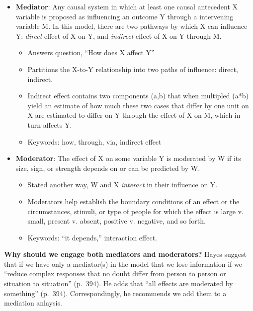 \documentclass[
  11pt,
]{book}
\providecommand{\tightlist}{%
  \setlength{\itemsep}{0pt}\setlength{\parskip}{0pt}}
\begin{document}
\begin{itemize}
\tightlist
\item
  \textbf{Mediator}: Any causal system in which at least one causal antecedent X variable is proposed as influencing an outcome Y through a intervening variable M. In this model, there are two pathways by which X can influence Y: \emph{direct} effect of X on Y, and \emph{indirect} effect of X on Y through M.

  \begin{itemize}
  \tightlist
  \item
    Answers question, ``How does X affect Y''
  \item
    Partitions the X-to-Y relationship into two paths of influence: direct, indirect.
  \item
    Indirect effect contains two components (a,b) that when multipled (a*b) yield an estimate of how much these two cases that differ by one unit on X are estimated to differ on Y through the effect of X on M, which in turn affects Y.
  \item
    Keywords: how, through, via, indirect effect
  \end{itemize}
\item
  \textbf{Moderator}: The effect of X on some variable Y is moderated by W if its size, sign, or strength depends on or can be predicted by W.

  \begin{itemize}
  \tightlist
  \item
    Stated another way, W and X \emph{interact} in their influence on Y.\\
  \item
    Moderators help establish the boundary conditions of an effect or the circumstances, stimuli, or type of people for which the effect is large v. small, present v. absent, positive v. negative, and so forth.
  \item
    Keywords: ``it depends,'' interaction effect.
  \end{itemize}
\end{itemize}

\textbf{Why should we engage both mediators and moderators?} Hayes \citeyearpar{hayes_introduction_2018} suggest that if we have only a mediator(s) in the model that we lose information if we ``reduce complex responses that no doubt differ from person to person or situation to situation'' (p.~394). He adds that ``all effects are moderated by something'' (p.~394). Correspondingly, he recommends we add them to a mediation anlaysis.
\end{document}
